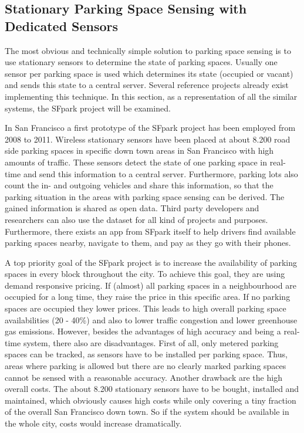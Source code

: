 \subsection{Stationary Parking Space Sensing with Dedicated Sensors}
\label{sec:stationary_park_sensing}

The most obvious and technically simple solution to parking space sensing is to use stationary sensors to determine the state of parking spaces. Usually one sensor per parking space is used which determines its state (occupied or vacant) and sends this state to a central server. Several reference projects already exist implementing this technique\cite{SFPark, VehicleSense}. In this section, as a representation of all the similar systems, the SFpark project will be examined.

In San Francisco a first prototype of the SFpark project \cite{SFPark} has been employed from 2008 to 2011. Wireless stationary sensors have been placed at about 8.200 road side parking spaces in specific down town areas in San Francisco with high amounts of traffic. These sensors detect the state of one parking space in real-time and send this information to a central server. Furthermore, parking lots also count the in- and outgoing vehicles and share this information, so that the parking situation in the areas with parking space sensing can be derived. The gained information is shared as open data. Third party developers and researchers can also use the dataset for all kind of projects and purposes. Furthermore, there exists an app from SFpark itself to help drivers find available parking spaces nearby, navigate to them, and pay as they go with their phones.

A top priority goal of the SFpark project is to increase the availability of parking spaces in every block throughout the city. To achieve this goal, they are using demand responsive pricing. If (almost) all parking spaces in a neighbourhood are occupied for a long time, they raise the price in this specific area. If no parking spaces are occupied they lower prices. This leads to high overall parking space availabilities (20 - 40\%) and also to lower traffic congestion and lower greenhouse gas emissions. However, besides the advantages of high accuracy and being a real-time system, there also are disadvantages. First of all, only metered parking spaces can be tracked, as sensors have to be installed per parking space. Thus, areas where parking is allowed but there are no clearly marked parking spaces cannot be sensed with a reasonable accuracy. Another drawback are the high overall costs. The about 8.200 stationary sensors have to be bought, installed and maintained, which obviously causes high costs while only covering a tiny fraction of the overall San Francisco down town. So if the system should be available in the whole city, costs would increase dramatically.






